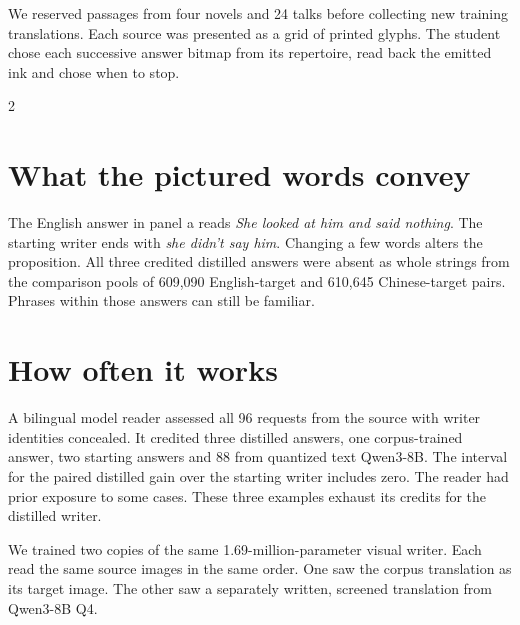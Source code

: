 \newpage
{}
\noindent We reserved passages from four novels and 24 talks before collecting new training translations. Each source was presented as a grid of printed glyphs. The student chose each successive answer bitmap from its repertoire, read back the emitted ink and chose when to stop.
\begin{multicols}{2}
\section*{What the pictured words convey}
The English answer in panel a reads \emph{She looked at him and said nothing}. The starting writer ends with \emph{she didn't say him}. Changing a few words alters the proposition. All three credited distilled answers were absent as whole strings from the comparison pools of 609,090 English-target and 610,645 Chinese-target pairs. Phrases within those answers can still be familiar.
\section*{How often it works}
A bilingual model reader assessed all 96 requests from the source with writer identities concealed. It credited three distilled answers, one corpus-trained answer, two starting answers and 88 from quantized text Qwen3-8B. The interval for the paired distilled gain over the starting writer includes zero. The reader had prior exposure to some cases. These three examples exhaust its credits for the distilled writer.
\end{multicols}
\newpage
{}
\noindent We trained two copies of the same 1.69-million-parameter visual writer. Each read the same source images in the same order. One saw the corpus translation as its target image. The other saw a separately written, screened translation from Qwen3-8B Q4.
